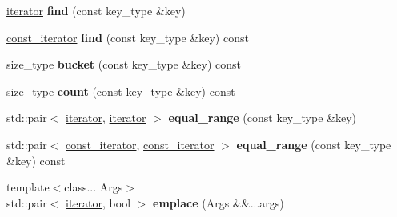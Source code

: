 \begin{DoxyCompactItemize}
\item 
\hyperlink{classspp___1_1_two__d__iterator}{iterator} {\bfseries find} (const key\+\_\+type \&key)\hypertarget{classspp___1_1sparse__hashtable_a946542d6a3a1b2ddeb3cd9626c21c7d9}{}\label{classspp___1_1sparse__hashtable_a946542d6a3a1b2ddeb3cd9626c21c7d9}

\item 
\hyperlink{classspp___1_1_two__d__iterator}{const\+\_\+iterator} {\bfseries find} (const key\+\_\+type \&key) const \hypertarget{classspp___1_1sparse__hashtable_a8745209bf805a81e71339f7f7322c95e}{}\label{classspp___1_1sparse__hashtable_a8745209bf805a81e71339f7f7322c95e}

\item 
size\+\_\+type {\bfseries bucket} (const key\+\_\+type \&key) const \hypertarget{classspp___1_1sparse__hashtable_a85d24099586087492938c03e1dfbab5b}{}\label{classspp___1_1sparse__hashtable_a85d24099586087492938c03e1dfbab5b}

\item 
size\+\_\+type {\bfseries count} (const key\+\_\+type \&key) const \hypertarget{classspp___1_1sparse__hashtable_a15311faba7cff845c575604681b51fc2}{}\label{classspp___1_1sparse__hashtable_a15311faba7cff845c575604681b51fc2}

\item 
std\+::pair$<$ \hyperlink{classspp___1_1_two__d__iterator}{iterator}, \hyperlink{classspp___1_1_two__d__iterator}{iterator} $>$ {\bfseries equal\+\_\+range} (const key\+\_\+type \&key)\hypertarget{classspp___1_1sparse__hashtable_a15e3d0d2ba05ac2006511ad5a82d8ed7}{}\label{classspp___1_1sparse__hashtable_a15e3d0d2ba05ac2006511ad5a82d8ed7}

\item 
std\+::pair$<$ \hyperlink{classspp___1_1_two__d__iterator}{const\+\_\+iterator}, \hyperlink{classspp___1_1_two__d__iterator}{const\+\_\+iterator} $>$ {\bfseries equal\+\_\+range} (const key\+\_\+type \&key) const \hypertarget{classspp___1_1sparse__hashtable_aeca6c1541db9b739c40cada295ddc1b4}{}\label{classspp___1_1sparse__hashtable_aeca6c1541db9b739c40cada295ddc1b4}

\item 
{\footnotesize template$<$class... Args$>$ }\\std\+::pair$<$ \hyperlink{classspp___1_1_two__d__iterator}{iterator}, bool $>$ {\bfseries emplace} (Args \&\&...args)\hypertarget{classspp___1_1sparse__hashtable_adcebe74ff1c1c7e29e326e9ef502e8b3}{}\label{classspp___1_1sparse__hashtable_adcebe74ff1c1c7e29e326e9ef502e8b3}


\end{DoxyCompactItemize}
